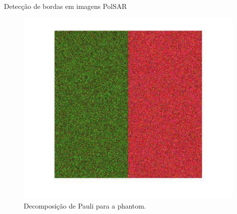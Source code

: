 \documentclass[10pt]{beamer}
\begin{document}
\begin{frame}{Detecção de bordas em imagens PolSAR}
  \begin{figure}[hbt]
\centering
	\includegraphics[scale=0.4]{phanton_nhfc_dec_pauli.pdf}
	\caption{Decomposição de Pauli para a phantom.}
\end{figure}
\end{frame}
\end{document}
